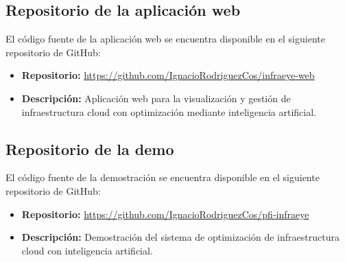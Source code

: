 
\subsection{Repositorio de la aplicación web}

El código fuente de la aplicación web se encuentra disponible en el siguiente repositorio de GitHub:

\begin{itemize}
    \item \textbf{Repositorio:} \url{https://github.com/IgnacioRodriguezCos/infraeye-web}
    \item \textbf{Descripción:} Aplicación web para la visualización y gestión de infraestructura cloud con optimización mediante inteligencia artificial.
\end{itemize}

\subsection{Repositorio de la demo}

El código fuente de la demostración se encuentra disponible en el siguiente repositorio de GitHub:

\begin{itemize}
    \item \textbf{Repositorio:} \url{https://github.com/IgnacioRodriguezCos/pfi-infraeye}
    \item \textbf{Descripción:} Demostración del sistema de optimización de infraestructura cloud con inteligencia artificial.
\end{itemize}

